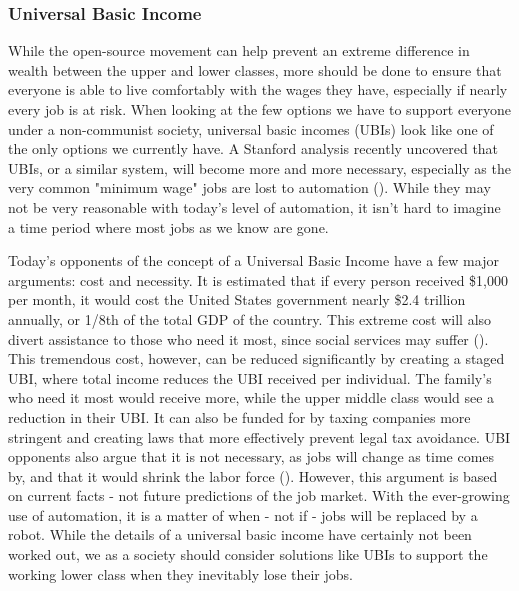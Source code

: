 \subsubsection{Universal Basic Income}

While the open-source movement can help prevent an extreme difference in wealth between the upper and lower classes, more should be done to ensure that everyone is able to live comfortably with the wages they have, especially if nearly every job is at risk. When looking at the few options we have to support everyone under a non-communist society, universal basic incomes (UBIs) look like one of the only options we currently have. A Stanford analysis recently uncovered that UBIs, or a similar system, will become more and more necessary, especially as the very common "minimum wage" jobs are lost to automation (\cite{StanfordUBI}). While they may not be very reasonable with today's level of automation, it isn't hard to imagine a time period where most jobs as we know are gone.

Today's opponents of the concept of a Universal Basic Income have a few major arguments: cost and necessity. It is estimated that if every person received \$1,000 per month, it would cost the United States government nearly \$2.4 trillion annually, or 1/8th of the total GDP of the country. This extreme cost will also divert assistance to those who need it most, since social services may suffer (\cite{UBI_WhyNot}). This tremendous cost, however, can be reduced significantly by creating a staged UBI, where total income reduces the UBI received per individual. The family's who need it most would receive more, while the upper middle class would see a reduction in their UBI. It can also be funded for by taxing companies more stringent and creating laws that more effectively prevent legal tax avoidance. UBI opponents also argue that it is not necessary, as jobs will change as time comes by, and that it would shrink the labor force (\cite{UBI_WhyNot}). However, this argument is based on current facts - not future predictions of the job market. With the ever-growing use of automation, it is a matter of when - not if - jobs will be replaced by a robot. While the details of a universal basic income have certainly not been worked out, we as a society should consider solutions like UBIs to support the working lower class when they inevitably lose their jobs.